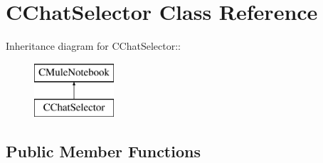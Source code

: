 \section{CChatSelector Class Reference}
\label{classCChatSelector}
Inheritance diagram for CChatSelector::\begin{figure}[H]
\begin{center}
\leavevmode
\includegraphics[height=2cm]{classCChatSelector}
\end{center}
\end{figure}
\subsection*{Public Member Functions}

